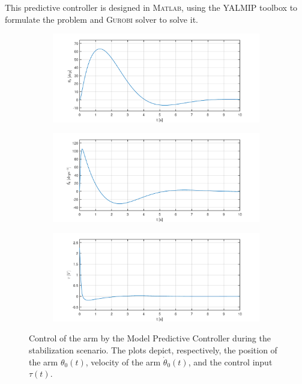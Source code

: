 This predictive controller is designed in \textsc{Matlab}, using the \textsc{YALMIP} toolbox \cite{YALMIP} to formulate the problem and \textsc{Gurobi} solver to solve it.
\newpage
\begin{figure}[H]
	\centering
	\begin{subfigure}
		\centering
		\includegraphics[scale=0.6]{images/MPC/arm.pdf}  
	\end{subfigure}
	\begin{subfigure}
		\centering
		\includegraphics[scale=0.6]{images/MPC/darm.pdf}  
	\end{subfigure}
	\begin{subfigure}
		\centering
		\includegraphics[scale=0.6]{images/MPC/control.pdf}  
	\end{subfigure}
	\caption{Control of the arm by the Model Predictive Controller during the stabilization scenario. The plots depict, respectively, the position of the arm $\theta_0(t)$, velocity of the arm $\dot{\theta}_0(t)$, and the control input $\tau(t)$.}
	\label{mpc}
\end{figure}
